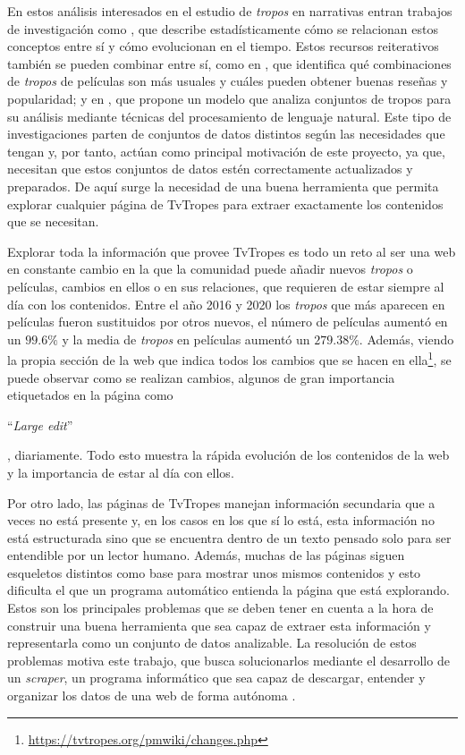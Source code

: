 En estos análisis interesados en el estudio de \textit{tropos} en narrativas
entran trabajos de investigación como \cite{garcia2020tropes}, que describe
estadísticamente cómo se relacionan estos conceptos entre sí y cómo evolucionan
en el tiempo. Estos recursos reiterativos también se pueden combinar entre sí,
como en \cite{garcia2021simpsons}, que identifica qué combinaciones de
\textit{tropos} de películas son más usuales y cuáles pueden obtener buenas
reseñas y popularidad; y en \cite{any2vec}, que propone un modelo que analiza
conjuntos de tropos para su análisis mediante técnicas del procesamiento de
lenguaje natural. Este tipo de investigaciones parten de conjuntos de datos
distintos según las necesidades que tengan y, por tanto, actúan como principal
motivación de este proyecto, ya que, necesitan que estos conjuntos de datos
estén correctamente actualizados y preparados. De aquí surge la necesidad de una
buena herramienta que permita explorar cualquier página de TvTropes para extraer
exactamente los contenidos que se necesitan.

Explorar toda la información que provee TvTropes es todo un reto al ser una web
en constante cambio en la que la comunidad puede añadir nuevos \textit{tropos} o
películas, cambios en ellos o en sus relaciones, que requieren de estar siempre
al día con los contenidos. Entre el año 2016 y 2020 los \textit{tropos} que más
aparecen en películas fueron sustituidos por otros nuevos, el número de
películas aumentó en un $99.6\%$ y la media de \textit{tropos} en películas
aumentó un $279.38\%$\cite{garcia2020tropes}. Además, viendo la propia sección
de la web que indica todos los cambios que se hacen en
ella\footnote{\url{https://tvtropes.org/pmwiki/changes.php}}, se puede observar
como se realizan cambios, algunos de gran importancia etiquetados en la página
como \begin{otherlanguage}{english}``\textit{Large edit}''\end{otherlanguage},
diariamente. Todo esto muestra la rápida evolución de los contenidos de la web y
la importancia de estar al día con ellos. 

Por otro lado, las páginas de TvTropes manejan información secundaria que a
veces no está presente y, en los casos en los que sí lo está, esta información
no está estructurada sino que se encuentra dentro de un texto pensado solo para
ser entendible por un lector humano. Además, muchas de las páginas siguen
esqueletos distintos como base para mostrar unos mismos contenidos y esto
dificulta el que un programa automático entienda la página que está explorando.
Estos son los principales problemas que se deben tener en cuenta a la hora de
construir una buena herramienta que sea capaz de extraer esta información y
representarla como un conjunto de datos analizable. La resolución de estos
problemas motiva este trabajo, que busca solucionarlos mediante el desarrollo de
un \textit{scraper}, un programa informático que sea capaz de descargar,
entender y organizar los datos de una web de forma autónoma
\cite{apress2018scraping}.

